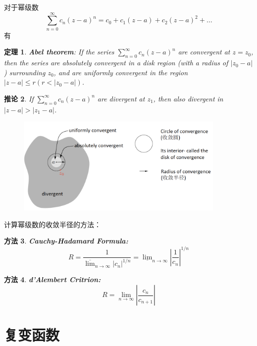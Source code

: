\documentclass[10pt, a4paper, oneside]{ctexbook}
\newtheorem{theorem}{定理}[section]
\newtheorem{corollary}[theorem]{推论}
\newtheorem{method}[theorem]{方法}
\begin{document}
对于幂级数
\begin{equation*}
    \sum_{n=0}^{\infty} c_{n}(z-a)^{n}=c_{0}+c_{1}(z-a)+c_{2}(z-a)^{2}+\ldots
\end{equation*} 有
\begin{theorem}\rm
    \textbf{Abel theorem}: If the series $\displaystyle \sum_{n=0}^{\infty} c_{n}(z-a)^{n}$ are convergent at $z=z_{0}$, then
    the series are absolutely convergent in a disk region (with a radius of $\left|z_{0}-a\right|$ ) surrounding $z_{0}$, and are uniformly convergent in the region $|z-a| \leq r\left(r<\left|z_{0}-a\right|\right)$.
\end{theorem}
\begin{corollary}\rm
    If $\displaystyle \sum_{n=0}^{\infty} c_{n}(z-a)^{n}$ are divergent at $z_{1}$, then also divergent in $|z-a|>\left|z_{1}-a\right|$.
\end{corollary}

\begin{figure}[h]
    \includegraphics[width=0.9\textwidth]{./assets/converge_radius.png}
\end{figure}
计算幂级数的收敛半径的方法：
\begin{method}
    {\rm \textbf{Cauchy-Hadamard Formula: }}
    \begin{equation*}
        R=\frac{1}{\overline{\lim }_{n \rightarrow \infty}\left|c_{n}\right|^{1 / n}}=\underline{\lim }_{n \rightarrow \infty}\left|\frac{1}{c_{n}}\right|^{1 / n}
    \end{equation*}
\end{method}
\begin{method}
    {\rm \textbf{d'Alembert Critrion: }}
    \begin{equation*}
        R=\lim _{n \rightarrow \infty}\left|\frac{c_{n}}{c_{n+1}}\right|
    \end{equation*}
\end{method}

\chapter{复变函数}
\end{document}
